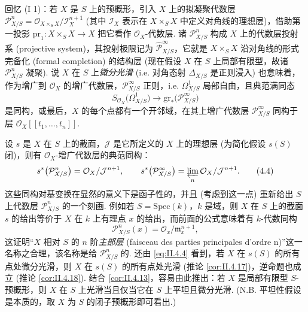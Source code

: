 \begingroup
\addtocounter{theorem}{-1}%
\renewcommand{\thetheorem}{\thesection.18}%
\begin{remark}\label{rem:II.4.18bis}
回忆 (I 1)：若 $X$ 是 $S$ 上的预概形，引入 $X$ 上的拟凝聚代数层 $\mathcal{P}_{X/S}^{n} = \mathcal{O}_{X \times_S X}/\mathcal{I}_X^{n+1}$ (其中 $\mathcal{I}_X$ 表示在 $X \times_S X$ 中定义对角线的理想层)，借助第一投影 $\mathrm{pr}_1 \colon X \times_S X \to X$ 把它看作 $\mathcal{O}_X$-代数层. 诸 $\mathcal{P}_{X/S}^{n}$ 构成 $X$ 上的代数层投射系 (projective system)，其投射极限记为 $\hat{\mathcal{P}}_{X/S}^{\infty}$，它就是 $X \times_S X$ 沿对角线的形式完备化 (formal completion) 的结构层 (现在假设 $X$ 在 $S$ 上局部有限型，故诸 $\mathcal{P}_{X/S}^{n}$ 凝聚). 说 $X$ 在 $S$ 上\emph{微分光滑} (i.e. 对角态射 $\Delta_{X/S}$ 是正则浸入) 也意味着，作为增广到 $\mathcal{O}_X$ 的增广代数层，$\mathcal{P}_{X/S}^{\infty}$ 正则，i.e. $\varOmega_{X/S}^{1}$ 局部自由，且典范满同态
\[
S_{\mathcal{O}_X}\bigl(\varOmega_{X/S}^{1}\bigr) \longrightarrow \mathrm{gr}_{*}\bigl(\mathcal{P}_{X/S}^{\infty}\bigr)
\]
是同构，或最后，$X$ 的每个点都有一个开邻域，在其上增广代数层 $\mathcal{P}_{X/S}^{\infty}$ 同构于层 $\mathcal{O}_X[\![t_1, \dots, t_n]\!]$.

设 $s$ 是 $X$ 在 $S$ 上的截面，$\mathcal{J}$ 是它所定义的 $X$ 上的理想层 (为简化假设 $s(S)$ 闭)，则有 $\mathcal{O}_X$-增广代数层的典范同构：
\begin{equation}
s^{*}\bigl(\mathcal{P}_{X/S}^{n}\bigr) = \mathcal{O}_X/\mathcal{J}^{n+1}, \qquad s^{*}\bigl(\mathcal{P}_{X/S}^{\infty}\bigr) = \varprojlim_n \mathcal{O}_X/\mathcal{J}^{n+1}. \tag{4.4}
\label{eq:II.4.4}
\end{equation}
这些同构对基变换在显然的意义下是函子性的，并且 (考虑到这一点) 重新给出 $S$ 上代数层 $\mathcal{P}_{X/S}^{n}$ 的一个刻画. 例如若 $S = \mathrm{Spec}(k)$，$k$ 是域，则 $X$ 在 $S$ 上的截面 $s$ 的给出等价于 $X$ 在 $k$ 上有理点 $x$ 的给出，而前面的公式意味着有 $k$-代数同构
\begin{equation}
\mathcal{P}_{X/S}^{n}(x) = \mathcal{O}_x/\mathfrak{m}_x^{n+1}, \tag{4.5}
\label{eq:II.4.5}
\end{equation}
这证明``$X$ 相对 $S$ 的 $n$ 阶\emph{主部层} (faisceau des parties principales d'ordre n)''这一名称之合理，该名称是给 $\mathcal{P}_{X/S}^{n}$ 的. 还由 \eqref{eq:II.4.4} 看到，若 $X$ 在 $s(S)$ 的所有点处微分光滑，则 $X$ 在 $s(S)$ 的所有点处光滑 (推论 \ref{cor:II.4.17})，逆命题也成立 (推论 \ref{cor:II.4.18}). 结合 \ref{cor:II.4.13}，容易由此推出：若 $X$ 是局部有限型 $S$-预概形，则 $X$ 在 $S$ 上光滑当且仅当它在 $S$ 上平坦且微分光滑. (N.B. 平坦性假设是本质的，取 $X$ 为 $S$ 的闭子预概形即可看出.)


\end{remark}
